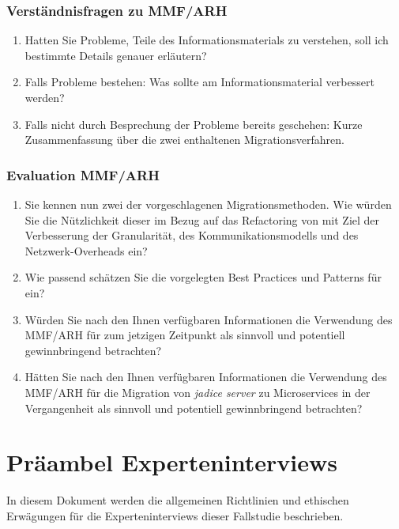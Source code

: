 \subsection{Verständnisfragen zu MMF/ARH}

\begin{enumerate}
	\item Hatten Sie Probleme, Teile des Informationsmaterials zu verstehen, soll ich bestimmte Details genauer erläutern?
	\item Falls Probleme bestehen: Was sollte am Informationsmaterial verbessert werden?
	\item Falls nicht durch Besprechung der Probleme bereits geschehen: Kurze Zusammenfassung über die zwei enthaltenen Migrationsverfahren.
\end{enumerate}

\subsection{Evaluation MMF/ARH}

\begin{enumerate}
	\item Sie kennen nun zwei der vorgeschlagenen Migrationsmethoden. Wie würden Sie die Nützlichkeit dieser im Bezug auf das Refactoring von \jf mit Ziel der Verbesserung der Granularität, des Kommunikationsmodells und des Netzwerk-Overheads ein?
	\item Wie passend schätzen Sie die vorgelegten Best Practices und Patterns für \jf ein?
	\item Würden Sie nach den Ihnen verfügbaren Informationen die Verwendung des MMF/ARH für \jf zum jetzigen Zeitpunkt als sinnvoll und potentiell gewinnbringend betrachten?
	\item Hätten Sie nach den Ihnen verfügbaren Informationen die Verwendung des MMF/ARH für die Migration von \emph{jadice server} zu Microservices in der Vergangenheit  als sinnvoll und potentiell gewinnbringend betrachten?
\end{enumerate}





\chapter{Präambel Experteninterviews}
\label{chap:expert-interviews-preamble}

In diesem Dokument werden die allgemeinen Richtlinien und ethischen Erwägungen für die Experteninterviews dieser Fallstudie beschrieben.

